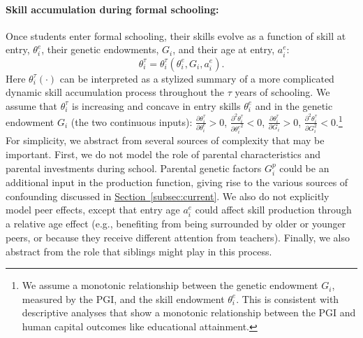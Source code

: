 \documentclass[12pt,a4paper]{article}
\begin{document}
\begin{bibunit}
\paragraph{Skill accumulation during formal schooling:}  Once students enter formal schooling, their skills evolve as a function of skill at entry, $\theta_{i}^{e}$, their genetic endowments, $G_{i}$, and their age at entry, $a_{i}^{e}$:
\begin{equation}
    \theta_{i}^{\tau}=\theta_{i}^\tau(\theta_{i}^{e},G_{i},a_{i}^{e}).
    \label{eq:Fs}
\end{equation}
Here $\theta_{i}^\tau(\cdot)$ can be interpreted as a stylized summary of a more complicated dynamic skill accumulation process throughout the $\tau$ years of schooling. We assume that $\theta_{i}^\tau$ is increasing and concave in entry skills $\theta_i^e$ and in the genetic endowment $G_i$ (the two continuous inputs): $\frac{\partial \theta_{i}^\tau}{\partial \theta_{i}^{e}}>0$, $\frac{\partial^{2} \theta_{i}^\tau}{\partial {\theta^{e}_{i}}^{2}}<0$, $\frac{\partial \theta_{i}^\tau}{\partial G_{i}}>0$, $\frac{\partial^{2} \theta_{i}^\tau}{\partial {G}_{i}^{2}}<0$.\footnote{We assume a monotonic relationship between the genetic endowment $G_i$, measured by the PGI, and the skill endowment $\theta_i^e$.  This is consistent with descriptive analyses that show a monotonic relationship between the PGI and human capital outcomes like educational attainment.} For simplicity, we abstract from several sources of complexity that may be important.  First, we do not model the role of parental characteristics and parental investments during school.  Parental genetic factors $G_{i}^{p}$ could be an additional input in the production function, giving rise to the various sources of confounding discussed in \hyperref[subsec:current]{Section~\ref*{subsec:current}}. We also do not explicitly model peer effects, except that entry age $a_{i}^{e}$ could affect skill production through a relative age effect (e.g., benefiting from being surrounded by older or younger peers, or because they receive different attention from teachers).  Finally, we also abstract from the role that siblings might play in this process.


\end{bibunit}
\end{document}
